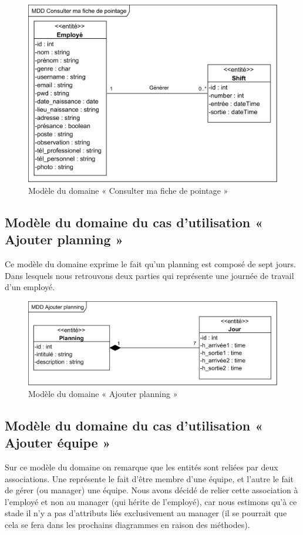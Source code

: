 \clearpage

\begin{figure}[h!]
    \centering
    \includegraphics[scale=1.168]{images/MDD/MDD Consulter ma fiche de pointage.png}
    \caption{Modèle du domaine « Consulter ma fiche de pointage »}
    \label{fig13}
\end{figure}
            
\subsection*{Modèle du domaine du cas d'utilisation « Ajouter planning »}
Ce modèle du domaine exprime le fait qu’un planning est composé de sept jours. 
Dans lesquels nous retrouvons deux parties qui représente une journée de travail 
d’un employé.

\begin{figure}[h!]
    \centering
    \includegraphics[scale=1.12]{images/MDD/MDD Ajouter planning.png}
    \caption{Modèle du domaine « Ajouter planning »}
    \label{fig14}
\end{figure}
        
\subsection*{Modèle du domaine du cas d'utilisation « Ajouter équipe »}
Sur ce modèle du domaine on remarque que les entités sont reliées par 
deux associations. Une représente le fait d’être membre d’une équipe, et 
l’autre le fait de gérer (ou manager) une équipe. Nous avons décidé de relier
cette association à l’employé et non au manager (qui hérite de l’employé), car
nous estimons qu’à ce stade il n’y a pas d'attributs liés exclusivement au
manager (il se pourrait que cela se fera dans les prochains diagrammes en raison
des méthodes).  

